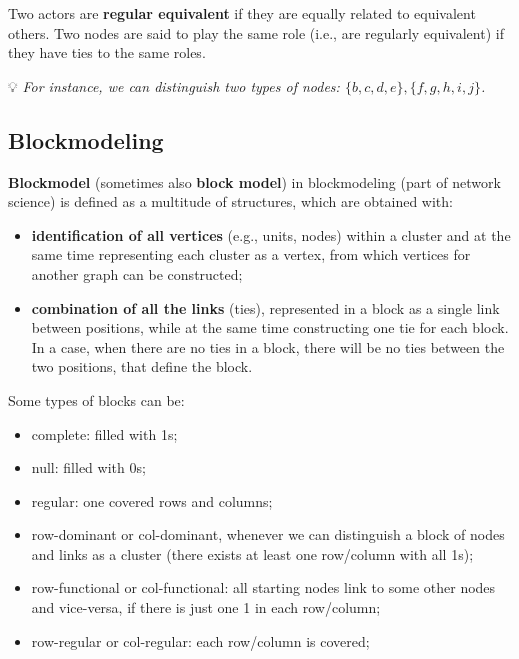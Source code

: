 \documentclass[
  notitlepage,
  onecolumn,
  openany]{book}
\providecommand{\tightlist}{%
  \setlength{\itemsep}{0pt}\setlength{\parskip}{0pt}}
\begin{document}
Two actors are \textbf{regular equivalent} if they are equally related to equivalent others. Two nodes are said to play the same role (i.e., are regularly equivalent) if they have ties to the same roles.

💡 \emph{For instance, we can distinguish two types of nodes: \(\{b,c,d,e\}, \{f,g,h,i,j\}\).}

\hypertarget{blockmodeling}{%
\subsection{Blockmodeling}\label{blockmodeling}}

\textbf{Blockmodel} (sometimes also \textbf{block model}) in blockmodeling (part of network science) is defined as a multitude of structures, which are obtained with:

\begin{itemize}
\tightlist
\item
  \textbf{identification of all vertices} (e.g., units, nodes) within a cluster and at the same time representing each cluster as a vertex, from which vertices for another graph can be constructed;
\item
  \textbf{combination of all the links} (ties), represented in a block as a single link between positions, while at the same time constructing one tie for each block. In a case, when there are no ties in a block, there will be no ties between the two positions, that define the block.
\end{itemize}

Some types of blocks can be:

\begin{itemize}
\tightlist
\item
  complete: filled with 1s;
\item
  null: filled with 0s;
\item
  regular: one covered rows and columns;
\item
  row-dominant or col-dominant, whenever we can distinguish a block of nodes and links as a cluster (there exists at least one row/column with all 1s);
\item
  row-functional or col-functional: all starting nodes link to some other nodes and vice-versa, if there is just one 1 in each row/column;
\item
  row-regular or col-regular: each row/column is covered;
\end{itemize}
\end{document}
